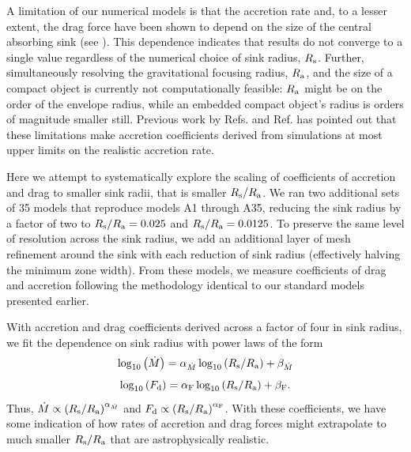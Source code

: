 A limitation of our numerical models is that the accretion rate and, to a lesser extent, the drag force have been shown to depend on the size of the central absorbing sink (see \cite{1994ApJ...427..351R, 1994A&AS..106..505R,1995A&AS..113..133R, 2012ApJ...752...30B,MacLeod_2015,Antoni:2019pgq}). This dependence indicates that results do not converge to a single value regardless of the numerical choice of sink radius, $R_{\rm s}$. Further, simultaneously resolving the gravitational focusing radius, $R_{\rm a}$, and the size of a compact object is currently not computationally feasible: $R_{\rm a}$ might be on the order of the envelope radius, while an embedded compact object's radius is orders of magnitude smaller still. Previous work by Refs. \cite{MacLeod:2014yda,MacLeod_2015} and Ref. \cite{MacLeod:2017} has pointed out that these limitations make accretion coefficients derived from simulations at most upper limits on the realistic accretion rate. 

Here we attempt to systematically explore the scaling of coefficients of accretion and drag to smaller sink radii, that is smaller $R_{\rm s}/R_{\rm a}$. We ran two additional sets of 35 models that reproduce models A1 through A35, reducing the sink radius by a factor of two to $R_{\rm s}/R_{\rm a}=0.025$ and $R_{\rm s}/R_{\rm a}=0.0125$. To preserve the same level of resolution across the sink radius, we add an additional layer of mesh refinement around the sink with each reduction of sink radius (effectively halving the minimum zone width). From these models, we measure coefficients of drag and accretion following the methodology identical to our standard models presented earlier. 

With accretion and drag coefficients derived across a factor of four in sink radius, we fit the dependence on sink radius with power laws of the form 
\begin{equation}\label{eq:powerlawacc}
    \log_{\rm 10}\left( \dot M \right) = {\alpha_{\dot M}} \log_{\rm 10}\left( R_{\rm s}/R_{\rm a} \right) + {\beta_{\dot M}}
\end{equation}
\begin{equation}\label{eq:powerlawdrag}
    \log_{\rm 10}\left( F_{\rm d} \right) = {\alpha_{\rm F}} \log_{\rm 10}\left( R_{\rm s}/R_{\rm a} \right) + {\beta_{\rm F}}.
\end{equation}
Thus, $\dot M \propto \left(R_{\rm s}/R_{\rm a}\right)^{\alpha_{\dot M}}$ and $F_{\rm d} \propto \left(R_{\rm s}/R_{\rm a}\right)^{\alpha_{\rm F}}$. With these coefficients, we have some indication of how rates of accretion and drag forces might extrapolate to much smaller $R_{\rm s}/R_{\rm a}$ that are astrophysically realistic. 

